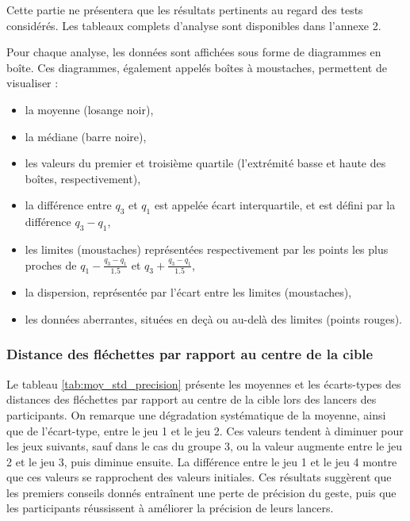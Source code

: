 Cette partie ne présentera que les résultats pertinents au regard des tests considérés. Les tableaux complets d'analyse sont disponibles dans l'annexe 2.

Pour chaque analyse, les données sont affichées sous forme de diagrammes en boîte. Ces diagrammes, également appelés boîtes à moustaches, permettent de visualiser :
\begin{itemize}[label=$-$]
	\item la moyenne (losange noir),
	\item la médiane (barre noire),
	\item les valeurs du premier et troisième quartile (l'extrémité basse et haute des boîtes, respectivement),
	\item la différence entre $q_3$ et $q_1$ est appelée écart interquartile, et est défini par la différence $q_3 - q_1$,
	\item les limites (moustaches) représentées respectivement par les points les plus proches de $q_1 - \frac{q_3 - q_1}{1.5}$ et $q_3 + \frac{q_3 - q_1}{1.5}$,
	\item la dispersion, représentée par l'écart entre les limites (moustaches),
	\item les données aberrantes, situées en deçà ou au-delà des limites (points rouges).
\end{itemize}


\subsubsection{Distance des fléchettes par rapport au centre de la cible}

Le tableau \ref{tab:moy_std_precision} présente les moyennes et les écarts-types des distances des fléchettes par rapport au centre de la cible lors des lancers des participants. On remarque une dégradation systématique de la moyenne, ainsi que de l'écart-type, entre le jeu 1 et le jeu 2. Ces valeurs tendent à diminuer pour les jeux suivants, sauf dans le cas du groupe 3, ou la valeur augmente entre le jeu 2 et le jeu 3, puis diminue ensuite. La différence entre le jeu 1 et le jeu 4 montre que ces valeurs se rapprochent des valeurs initiales. Ces résultats suggèrent que les premiers conseils donnés entraînent une perte de précision du geste, puis que les participants réussissent à améliorer la précision de leurs lancers.

